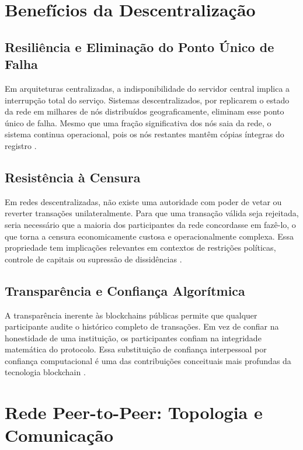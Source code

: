 \documentclass[12pt,a4paper]{report}
\begin{document}
\section{Benefícios da Descentralização}

\subsection{Resiliência e Eliminação do Ponto Único de Falha}

Em arquiteturas centralizadas, a indisponibilidade do servidor central implica a interrupção total do serviço. Sistemas descentralizados, por replicarem o estado da rede em milhares de nós distribuídos geograficamente, eliminam esse ponto único de falha. Mesmo que uma fração significativa dos nós saia da rede, o sistema continua operacional, pois os nós restantes mantêm cópias íntegras do registro \cite{Bashir2023}.

\subsection{Resistência à Censura}

Em redes descentralizadas, não existe uma autoridade com poder de vetar ou reverter transações unilateralmente. Para que uma transação válida seja rejeitada, seria necessário que a maioria dos participantes da rede concordasse em fazê-lo, o que torna a censura economicamente custosa e operacionalmente complexa. Essa propriedade tem implicações relevantes em contextos de restrições políticas, controle de capitais ou supressão de dissidências \cite{Bashir2023}.

\subsection{Transparência e Confiança Algorítmica}

A transparência inerente às blockchains públicas permite que qualquer participante audite o histórico completo de transações. Em vez de confiar na honestidade de uma instituição, os participantes confiam na integridade matemática do protocolo. Essa substituição de confiança interpessoal por confiança computacional é uma das contribuições conceituais mais profundas da tecnologia blockchain \cite{Bashir2023}.

\section{Rede Peer-to-Peer: Topologia e Comunicação}
\end{document}
